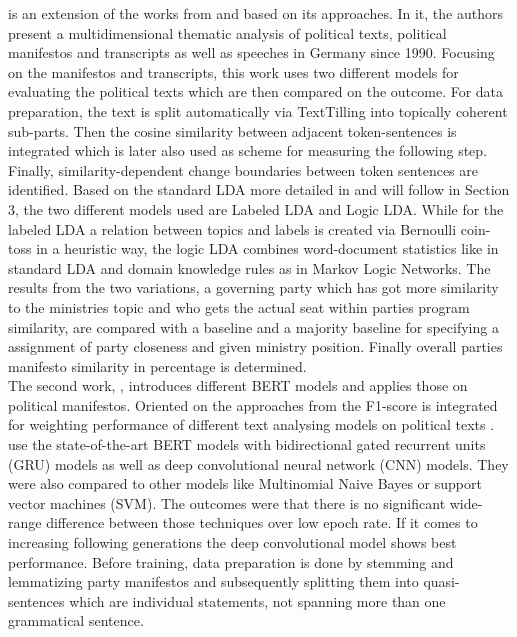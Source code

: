 \citet{zirn2014multidimensional} is an extension of the works from \citet{stuckenschmidt2012multi} and based on its approaches. In it, the authors present a multidimensional thematic analysis of political texts, political manifestos and transcripts as well as speeches in Germany since 1990. Focusing on the manifestos and transcripts, this work uses two different models for evaluating the political texts which are then compared on the outcome. For data preparation, the text is split automatically via TextTilling into topically coherent sub-parts. Then the cosine similarity  between adjacent token-sentences is integrated which is later also used as scheme for measuring the following step. Finally, similarity-dependent change boundaries between token sentences are identified. Based on the standard LDA more detailed in \citet{newman2009distributed,blei2003latent} and will follow in Section 3, the two different models used are Labeled LDA and Logic LDA.
While for the labeled LDA a relation between topics and labels is created via Bernoulli coin-toss in a heuristic way, the logic LDA combines word-document statistics like in standard LDA and domain knowledge
rules as in Markov Logic Networks.
The results from the two variations, a governing party which has got more similarity to the ministries topic and who gets the actual seat within parties program similarity, are compared with a baseline and a majority baseline for specifying a assignment of party closeness and given ministry position. Finally overall parties manifesto similarity in percentage is determined.
\\
The second work, \citet{koh2021predicting}, introduces different BERT models and applies those on political manifestos. Oriented on the approaches from \citet{abercrombie2019policy} the F1-score  is integrated for weighting performance of different text analysing models on political texts \cite{zhang2015estimating}. \citet{koh2021predicting} use the state-of-the-art BERT models with bidirectional gated recurrent units (GRU) models as well as deep convolutional neural network (CNN) models. They were also compared to other models like Multinomial Naive Bayes or support vector machines (SVM). The outcomes were that there is no significant wide-range difference between those techniques over low epoch rate. If it comes to increasing following generations the deep convolutional model shows best performance. Before training, data preparation is done by stemming and lemmatizing party manifestos and subsequently splitting them into quasi-sentences which are individual statements, not spanning more than one grammatical sentence.
